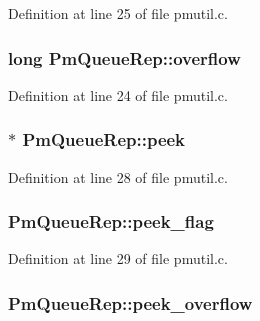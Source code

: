 Definition at line 25 of file pmutil.\+c.

\subsubsection[{\texorpdfstring{overflow}{overflow}}]{\setlength{\rightskip}{0pt plus 5cm}long Pm\+Queue\+Rep\+::overflow}\hypertarget{struct_pm_queue_rep_a5fcbe9d90e738fb69b03ba7f2b847581}{}\label{struct_pm_queue_rep_a5fcbe9d90e738fb69b03ba7f2b847581}


Definition at line 24 of file pmutil.\+c.

\subsubsection[{\texorpdfstring{peek}{peek}}]{$\ast$ Pm\+Queue\+Rep\+::peek}\hypertarget{struct_pm_queue_rep_a0b498ff007aae21d7d6651722cc781c3}{}\label{struct_pm_queue_rep_a0b498ff007aae21d7d6651722cc781c3}


Definition at line 28 of file pmutil.\+c.

\subsubsection[{\texorpdfstring{peek\+\_\+flag}{peek_flag}}]{ Pm\+Queue\+Rep\+::peek\+\_\+flag}\hypertarget{struct_pm_queue_rep_ad8f20dd6f8f014da9c6ff04ae0ba537f}{}\label{struct_pm_queue_rep_ad8f20dd6f8f014da9c6ff04ae0ba537f}


Definition at line 29 of file pmutil.\+c.

\subsubsection[{\texorpdfstring{peek\+\_\+overflow}{peek_overflow}}]{ Pm\+Queue\+Rep\+::peek\+\_\+overflow}\hypertarget{struct_pm_queue_rep_ab5aa2fd81ec89f4674a87485398ab0dd}{}\label{struct_pm_queue_rep_ab5aa2fd81ec89f4674a87485398ab0dd}


